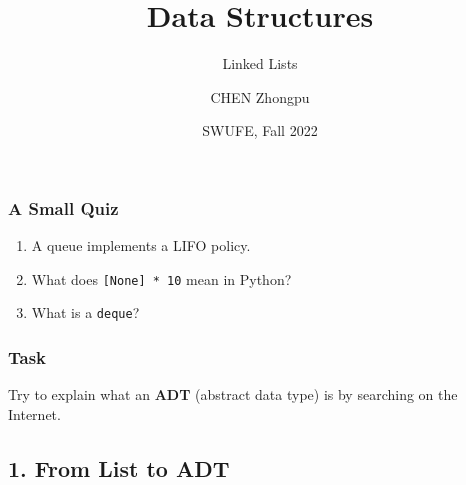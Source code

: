 \documentclass[aspectratio=169, 14pt]{beamer}
\title[Data Structures] %
{Data Structures}
\subtitle{Linked Lists}
\author[CHEN Zhongpu] %
{CHEN Zhongpu}
\institute[] %
{
  School of Computing and Artificial Intelligence \\
  \href{mailto:zpchen@swufe.edu.cn}{zpchen@swufe.edu.cn}
}
\date[] %
{SWUFE, Fall 2022}
\begin{document}
\frame{\titlepage}

\begin{frame}
\frametitle{A Small Quiz}
\begin{enumerate}
    \item A queue implements a LIFO policy.
    \item What does \texttt{[None] * 10} mean in Python?
    \item What is a \texttt{deque}?
\end{enumerate}
\end{frame}


\begin{frame}
    \frametitle{Task}
Try to explain what an \textbf{ADT} (abstract data type) is by searching on the Internet.
    

\end{frame}

{
    \begin{frame}
        \section{\textcolor{darkmidnightblue}{1. From List to ADT}}
    \end{frame}

}
\end{document}
